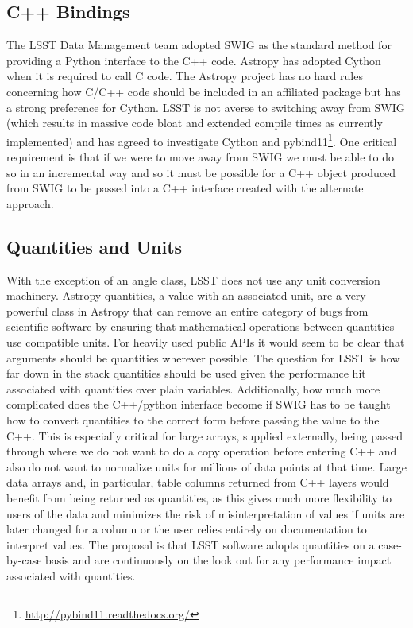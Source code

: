 \documentclass[]{spie}  %
\begin{document}
\subsection{C++ Bindings}

The LSST Data Management team adopted SWIG as the standard method for providing a Python interface to the C++ code.
Astropy has adopted Cython\cite{2010/content/aip/journal/cise/13/2/10.1109/MCSE.2010.118} when it is required to call C code.
The Astropy project has no hard rules concerning how C/C++ code should be included in an affiliated package but has a strong preference for Cython.
LSST is not averse to switching away from SWIG (which results in massive code bloat and extended compile times as currently implemented) and has agreed to investigate Cython\cite{dmtn-013} and pybind11\cite{dmtn-014}\footnote{\url{http://pybind11.readthedocs.org/}}.
One critical requirement is that if we were to move away from SWIG we must be able to do so in an incremental way and so it must be possible for a C++ object produced from SWIG to be passed into a C++ interface created with the alternate approach.

\subsection{Quantities and Units}

With the exception of an angle class, LSST does not use any unit conversion machinery.
Astropy quantities, a value with an associated unit, are a very powerful class in Astropy that can remove an entire category of bugs from scientific software by ensuring that mathematical operations between quantities use compatible units.
For heavily used public APIs it would seem to be clear that arguments should be quantities wherever possible.
The question for LSST is how far down in the stack quantities should be used given the performance hit associated with quantities over plain variables.
Additionally, how much more complicated does the C++/python interface become if SWIG has to be taught how to convert quantities to the correct form before passing the value to the C++.
This is especially critical for large arrays, supplied externally, being passed through where we do not want to do a copy operation before entering C++ and also do not want to normalize units for millions of data points at that time.
Large data arrays and, in particular, table columns returned from C++ layers would benefit from being returned as quantities, as this gives much more flexibility to users of the data and minimizes the risk of misinterpretation of values if units are later changed for a column or the user relies entirely on documentation to interpret values.
The proposal is that LSST software adopts quantities on a case-by-case basis and are continuously on the look out for  any performance impact associated with quantities.
\end{document}
